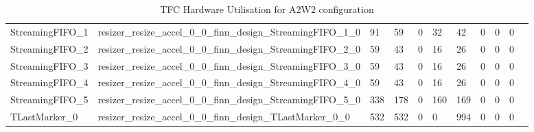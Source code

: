 \begin{landscape}
\begin{table}[!htb]
{\begin{tabular}{l|l|l|l|l|l|l|l|l|l|l}
   StreamingFIFO\_1                                        & resizer\_resize\_accel\_0\_0\_finn\_design\_StreamingFIFO\_1\_0                                        & 91         & 59         & 0       & 32   & 42    & 0      & 0      & 0            \\
   StreamingFIFO\_2                                        & resizer\_resize\_accel\_0\_0\_finn\_design\_StreamingFIFO\_2\_0                                        & 59         & 43         & 0       & 16   & 26    & 0      & 0      & 0            \\
   StreamingFIFO\_3                                        & resizer\_resize\_accel\_0\_0\_finn\_design\_StreamingFIFO\_3\_0                                        & 59         & 43         & 0       & 16   & 26    & 0      & 0      & 0            \\
   StreamingFIFO\_4                                        & resizer\_resize\_accel\_0\_0\_finn\_design\_StreamingFIFO\_4\_0                                        & 59         & 43         & 0       & 16   & 26    & 0      & 0      & 0            \\
   StreamingFIFO\_5                                        & resizer\_resize\_accel\_0\_0\_finn\_design\_StreamingFIFO\_5\_0                                        & 338        & 178        & 0       & 160  & 169   & 0      & 0      & 0            \\
   TLastMarker\_0                                          & resizer\_resize\_accel\_0\_0\_finn\_design\_TLastMarker\_0\_0                                          & 532        & 532        & 0       & 0    & 994   & 0      & 0      & 0            \\
\end{tabular}
}
\caption[TFC Hardware Utilisation A2W2]{TFC Hardware Utilisation for A2W2 configuration}
  \label{tab:TFCHardwareA2W2}
\end{table}



\end{landscape}

